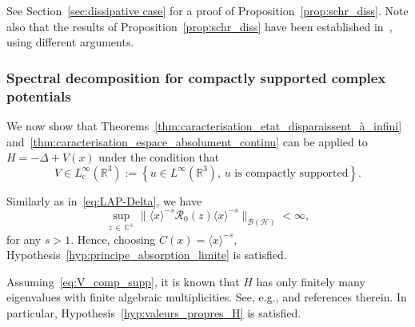 \documentclass[AHL,Unicode,longabstracts,published]{cedram}
\newcommand{\Hi}{\mathcal{H}}
\newcommand{\bbC}{\mathbb{C}}
\newcommand{\R}{\mathbb{R}}
\newcommand{\rmc}{\mathrm{c}}
\newcommand{\Res}{\mathcal{R}}
\newcommand{\clB}{\mathcal{B}}
\newcommand*\bbC{\mathbb{C}}
\newcommand{\Hi}{\mathcal{H}}
\newcommand{\R}{\mathbb{R}}
\begin{document}
See Section~\ref{sec:dissipative case} for a proof of Proposition~\ref{prop:schr_diss}. Note also that the results of Proposition~\ref{prop:schr_diss} have been established in~\cite{Wa11_01,Wa12_01}, using different arguments.


\subsubsection{Spectral decomposition for compactly supported complex potentials}

We now show that Theorems~\ref{thm:caracterisation_etat_disparaissent_à_infini} and~\ref{thm:caracterisation_espace_absolument_continu} can be applied to $H=-\Delta+V(x)$ under the condition that
\begin{equation}\label{eq:V_comp_supp}
V \in L^\infty_{ \rmc }(\R^3) := \left\{ u \in L^\infty(\R^3), \, u \text{ is compactly supported} \right\}.
\end{equation}

Similarly as in~\eqref{eq:LAP-Delta}, we have
\begin{equation*}
\sup_{z\,\in\,\bbC^\pm}\big\|\langle x\rangle^{-s}\Res_0(z)\langle x\rangle^{-s}\big\|_{\clB(\Hi)}<\infty,
\end{equation*}
for any $s>1$. Hence, choosing $C(x)=\langle x\rangle^{-s}$, Hypothesis~\ref{hyp:principe_absorption_limite} is satisfied.

Assuming~\eqref{eq:V_comp_supp}, it is known that $H$ has only finitely many eigenvalues with finite algebraic multiplicities. See, e.g., \cite{FrLaSa16_01} and references therein. In particular, Hypothesis~\ref{hyp:valeurs_propres_H} is satisfied.
\end{document}
